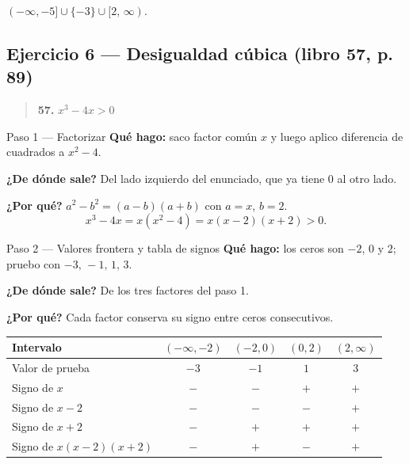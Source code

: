 \documentclass[11pt]{article}
\begin{document}
\begin{center}
\end{center}

\begin{resp}
$(-\infty,-5]\cup\{-3\}\cup[2,\,\infty)$.
\end{resp}

\subsection*{Ejercicio 6 --- Desigualdad cúbica (libro 57, p. 89)}

\begin{quote}
\textbf{57.} $x^3-4x>0$
\end{quote}

\begin{paso}{Paso 1 --- Factorizar}
\textbf{Qué hago:} saco factor común $x$ y luego aplico diferencia de cuadrados a $x^2-4$.

\textbf{¿De dónde sale?} Del lado izquierdo del enunciado, que ya tiene $0$ al otro lado.

\textbf{¿Por qué?} $a^2-b^2=(a-b)(a+b)$ con $a=x$, $b=2$.
\[
x^3-4x=x(x^2-4)=x(x-2)(x+2)>0.
\]
\end{paso}

\begin{paso}{Paso 2 --- Valores frontera y tabla de signos}
\textbf{Qué hago:} los ceros son $-2$, $0$ y $2$; pruebo con $-3,\,-1,\,1,\,3$.

\textbf{¿De dónde sale?} De los tres factores del paso 1.

\textbf{¿Por qué?} Cada factor conserva su signo entre ceros consecutivos.

\begin{center}
\begin{tabular}{|l|c|c|c|c|}
\hline
Intervalo & $(-\infty,-2)$ & $(-2,0)$ & $(0,2)$ & $(2,\infty)$ \\
\hline
Valor de prueba & $-3$ & $-1$ & $1$ & $3$ \\
Signo de $x$ & $-$ & $-$ & $+$ & $+$ \\
Signo de $x-2$ & $-$ & $-$ & $-$ & $+$ \\
Signo de $x+2$ & $-$ & $+$ & $+$ & $+$ \\
\hline
Signo de $x(x-2)(x+2)$ & $-$ & $+$ & $-$ & $+$ \\
\hline
\end{tabular}
\end{center}
\end{paso}
\end{document}
